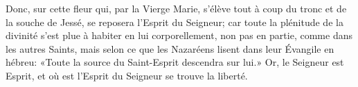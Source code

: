 Donc, sur cette fleur qui, par la Vierge Marie,
	s’élève tout à coup du tronc et de la souche de Jessé,
	se reposera l’Esprit du Seigneur;
	car toute la plénitude de la divinité
		s’est plue à habiter en lui corporellement,
	non pas en partie, comme dans les autres Saints,
	mais selon ce que les Nazaréens lisent dans leur Évangile en hébreu:
	«Toute la source du Saint-Esprit descendra sur lui.»
Or, le Seigneur est Esprit,
	et où est l’Esprit du Seigneur se trouve la liberté.
